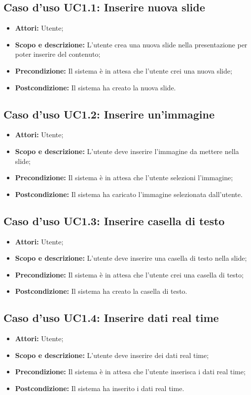 \subsection{Caso d'uso UC1.1: Inserire nuova slide}
\begin{itemize}
	\item \textbf{Attori:} Utente;
	\item \textbf{Scopo e descrizione:} L'utente crea una nuova slide nella presentazione per poter inserire del contenuto;
	\item \textbf{Precondizione:} Il sistema è in attesa che l'utente crei una nuova slide;
	\item \textbf{Postcondizione:} Il sistema ha creato la nuova slide.
\end{itemize}

\subsection{Caso d'uso UC1.2: Inserire un'immagine}
\begin{itemize}
\item \textbf{Attori:} Utente;
\item \textbf{Scopo e descrizione:} L'utente deve inserire l'immagine da mettere nella slide;
\item \textbf{Precondizione:} Il sistema è in attesa che l'utente selezioni l'immagine;
\item \textbf{Postcondizione:} Il sistema ha caricato l'immagine selezionata dall'utente.
\end{itemize}

\subsection{Caso d'uso UC1.3: Inserire casella di testo}
\begin{itemize}
\item \textbf{Attori:} Utente;
\item \textbf{Scopo e descrizione:} L'utente deve inserire una casella di testo nella slide;
\item \textbf{Precondizione:} Il sistema è in attesa che l'utente crei una casella di testo;
\item \textbf{Postcondizione:} Il sistema ha creato la casella di testo.
\end{itemize}

\subsection{Caso d'uso UC1.4: Inserire dati real time}
\begin{itemize}
	\item \textbf{Attori:} Utente;
	\item \textbf{Scopo e descrizione:} L'utente deve inserire dei dati real time;
	\item \textbf{Precondizione:} Il sistema è in attesa che l'utente inserisca i dati real time;
	\item \textbf{Postcondizione:} Il sistema ha inserito i dati real time.
\end{itemize}

